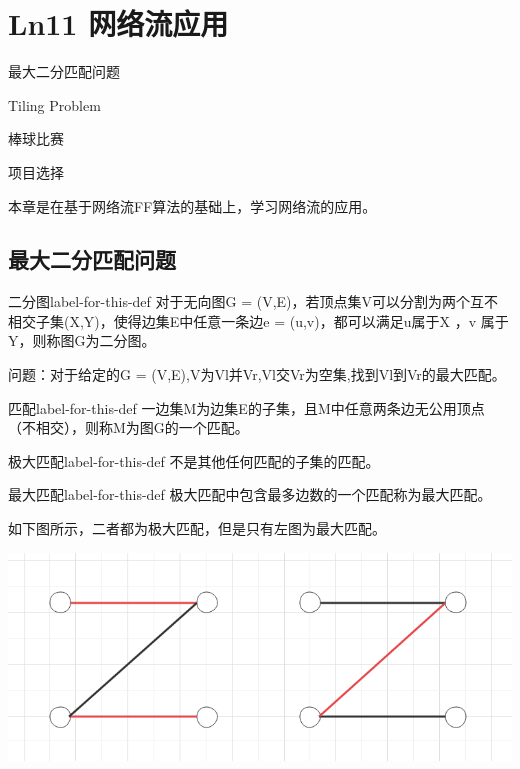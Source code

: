 \chapter{Ln11 网络流应用}

\begin{introduction}
\item 最大二分匹配问题
\item Tiling Problem
\item 棒球比赛
\item 项目选择
\end{introduction}

本章是在基于网络流FF算法的基础上，学习网络流的应用。

\section{最大二分匹配问题}

\begin{definition}{二分图}{label-for-this-def}
    对于无向图G = (V,E)，若顶点集V可以分割为两个互不相交子集(X,Y)，使得边集E中任意一条边e = (u,v)，都可以满足u属于X ，v 属于Y，则称图G为二分图。
\end{definition}

问题：对于给定的G = (V,E),V为Vl并Vr,Vl交Vr为空集,找到Vl到Vr的最大匹配。

\begin{definition}{匹配}{label-for-this-def}
    一边集M为边集E的子集，且M中任意两条边无公用顶点（不相交），则称M为图G的一个匹配。
\end{definition}

\begin{definition}{极大匹配}{label-for-this-def}
    不是其他任何匹配的子集的匹配。
\end{definition}

\begin{definition}{最大匹配}{label-for-this-def}
    极大匹配中包含最多边数的一个匹配称为最大匹配。
\end{definition}

如下图所示，二者都为极大匹配，但是只有左图为最大匹配。\\
\centerline{\includegraphics[scale=0.4]{Ln11.image/networkflow1.png}}

